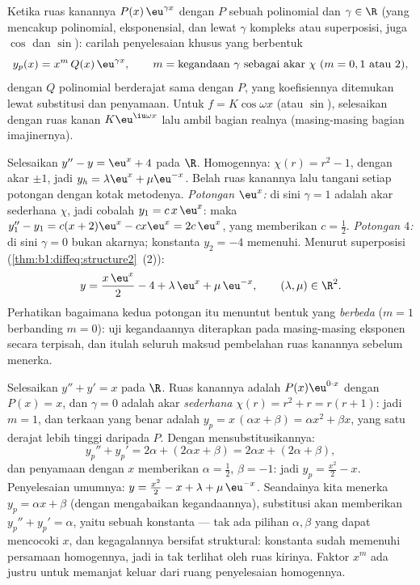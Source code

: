 \begin{method}[Penyelesaian khusus untuk $f(x) = P(x)\,\eu^{\gamma x}$]\label{met:b1:diffeq:particular}
Ketika ruas kanannya $P(x)\,\eu^{\gamma x}$ dengan $P$ sebuah
polinomial dan $\gamma \in \R$ (yang mencakup polinomial, eksponensial,
dan lewat $\gamma$ kompleks atau superposisi, juga $\cos$ dan $\sin$): carilah
penyelesaian khusus yang berbentuk
\[
y_p(x) = x^{m}\, Q(x)\, \eu^{\gamma x},
\qquad
m = \text{kegandaan } \gamma \text{ sebagai akar } \chi
\ (m = 0, 1 \text{ atau } 2),
\]
dengan $Q$ polinomial berderajat sama dengan $P$, yang koefisiennya
ditemukan lewat substitusi dan penyamaan. Untuk $f = K\cos\omega x$
(atau $\sin$), selesaikan dengan ruas kanan $K\eu^{\iu\omega x}$ lalu ambil
bagian realnya (masing-masing bagian imajinernya).
\end{method}

\begin{example}\label{ex:b1:diffeq:superposition}
Selesaikan $y'' - y = \eu^{x} + 4$ pada $\R$. Homogennya: $\chi(r) = r^2
- 1$, dengan akar $\pm1$, jadi $y_h = \lambda\eu^x + \mu\eu^{-x}$. Belah
ruas kanannya lalu tangani setiap potongan dengan kotak metodenya.
\emph{Potongan $\eu^x$:} di sini $\gamma = 1$ adalah akar sederhana
$\chi$, jadi cobalah $y_1 = c\,x\,\eu^x$: maka $y_1'' - y_1 = c(x +
2)\eu^x - cx\eu^x = 2c\,\eu^x$, yang memberikan $c = \frac12$.
\emph{Potongan $4$:} di sini $\gamma = 0$ bukan akarnya; konstanta $y_2 =
-4$ memenuhi. Menurut superposisi
(\cref{thm:b1:diffeq:structure2}~(2)):
\[
y = \frac{x\,\eu^x}2 - 4 + \lambda\,\eu^x + \mu\,\eu^{-x},
\qquad (\lambda, \mu) \in \R^2 .
\]
Perhatikan bagaimana kedua potongan itu menuntut bentuk yang \emph{berbeda} ($m = 1$
berbanding $m = 0$): uji kegandaannya diterapkan pada masing-masing
eksponen secara terpisah, dan itulah seluruh maksud pembelahan
ruas kanannya sebelum menerka.
\end{example}

\begin{example}\label{ex:b1:diffeq:multiplicity}
Selesaikan $y'' + y' = x$ pada $\R$. Ruas kanannya adalah $P(x)\eu^{0
\cdot x}$ dengan $P(x) = x$, dan $\gamma = 0$ adalah akar \emph{sederhana}
$\chi(r) = r^2 + r = r(r + 1)$: jadi $m = 1$, dan terkaan
yang benar adalah $y_p = x\,(\alpha x + \beta) = \alpha x^2 + \beta x$, yang satu
derajat lebih tinggi daripada $P$. Dengan mensubstitusikannya:
\[
y_p'' + y_p' = 2\alpha + (2\alpha x + \beta)
= 2\alpha x + (2\alpha + \beta) ,
\]
dan penyamaan dengan $x$ memberikan $\alpha = \frac12$, $\beta = -1$:
jadi $y_p = \frac{x^2}2 - x$. Penyelesaian umumnya: $y = \frac{x^2}2 - x +
\lambda + \mu\,\eu^{-x}$. Seandainya kita menerka $y_p = \alpha x + \beta$
(dengan mengabaikan kegandaannya), substitusi akan memberikan $y_p'' + y_p'
= \alpha$, yaitu sebuah konstanta --- tak ada pilihan $\alpha, \beta$ yang dapat mencocoki
$x$, dan kegagalannya bersifat struktural: konstanta sudah memenuhi
persamaan homogennya, jadi ia tak terlihat oleh ruas kirinya.
Faktor $x^m$ ada justru untuk memanjat keluar dari ruang penyelesaian
homogennya.
\end{example}

